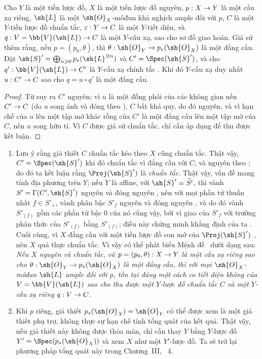 \documentclass[oneside,10pt]{amsart}
\makeatletter
\renewcommand{\geq}{\geqslant}
\newcommand{\ega@arrow}[2]{\mathchoice{#1}{#2}{#2}{#2}}
\renewcommand{\to}{\ega@arrow{\longrightarrow}{\rightarrow}}
\let\EGAOriginalLabel\label
\renewcommand{\label}[1]{\phantomsection\EGAOriginalLabel{#1}}
\makeatother
\begin{document}
\begin{proposition}[8.11.7]
\label{II.8.11.7}
Cho $Y$ là một tiền lược đồ, $X$ là một tiền lược đồ nguyên, $p:X\to Y$ là một cấu xạ riêng, $\sh{L}$ là một $\sh{O}_X$-môđun khả nghịch ample đối với $p$, $C$ là một $Y$-tiền lược đồ chuẩn tắc, $\varepsilon:Y\to C$ là một $Y$-tiết diện, và $q:V=\bb{V}(\sh{L})\to C$ là một $Y$-cấu xạ, sao cho sơ đồ  giao hoán.
Giả sử thêm rằng, nếu $p=(p_0,\theta)$, thì $\theta:\sh{O}_Y\to p_*(\sh{O}_X)$ là một đẳng cấu.
Đặt $\sh{S}'=\bigoplus_{n\geq0}p_*(\sh{L}^{\otimes n})$ và $C'=\Spec(\sh{S}')$, và cho $q':\bb{V}(\sh{L})\to C'$ là $Y$-cấu xạ chính tắc .
Khi đó $Y$-cấu xạ duy nhất $u:C'\to C$ sao cho $q=u\circ q'$ là một đẳng cấu.
\end{proposition}

\begin{proof}
Từ  suy ra $C'$ nguyên;
vì $u$ là một đồng phôi của các không gian nền $C'\to C$ (do $u$ song ánh và đóng theo ), $C$ bất khả quy, do đó nguyên, và vì hạn chế của $u$ lên một tập mở khác rỗng của $C'$ là một đẳng cấu lên một tập mở của $C$, nên $u$ song hữu tỉ.
Vì $C$ được giả sử chuẩn tắc, chỉ cần áp dụng  để thu được kết luận.
\end{proof}

\begin{remark}[8.11.8]
\label{II.8.11.8}
\begin{enumerate}
  \item[\rm{(i)}] Lưu ý rằng giả thiết $C$ chuẩn tắc kéo theo $X$ cũng chuẩn tắc.
  Thật vậy, $C'=\Spec(\sh{S}')$ khi đó chuẩn tắc vì đẳng cấu với $C$, và nguyên theo ; do đó ta kết luận rằng $\Proj(\sh{S}')$ là \emph{chuẩn tắc}.
  Thật vậy, vấn đề mang tính địa phương trên $Y$;
  nếu $Y$ là affine, với $\sh{S}'=\widetilde{S'}$, thì vành $S'=\Gamma(C',\sh{S}')$ nguyên và đóng nguyên , nên với mọi phần tử thuần nhất $f\in S'_+$, vành phân bậc $S'_f$ nguyên và đóng nguyên \cite[t.~I, p.~257 và 261]{I-13}, và do đó vành $S'_{(f)}$ gồm các phần tử bậc 0 của nó cũng vậy, bởi vì giao của $S'_f$ với trường phân thức của $S'_{(f)}$ bằng $S'_{(f)}$;
  điều này chứng minh khẳng định của ta .
  Cuối cùng, vì $X$ đẳng cấu với một tiền lược đồ con mở của $\Proj(\sh{S}')$ , nên $X$ quả thực chuẩn tắc.
  Vì vậy có thể phát biểu Mệnh đề~ dưới dạng sau:
  \emph{Nếu $X$ nguyên và chuẩn tắc, và $p=(p_0,\theta):X\to Y$ là một cấu xạ riêng sao cho $\theta:\sh{O}_Y\to p_*(\sh{O}_X)$ là một đẳng cấu, thì với mọi $\sh{O}_X$-môđun $\sh{L}$ ample đối với $p$, tồn tại đúng một cách co tiết diện không của $V=\bb{V}(\sh{L})$ sao cho thu được một $Y$-lược đồ chuẩn tắc $C$ và một $Y$-cấu xạ riêng $q:V\to C$.}
  \item[\rm{(ii)}] Khi $p$ riêng, giả thiết $p_*(\sh{O}_X)=\sh{O}_Y$ có thể được xem là một giả thiết phụ trợ, không thực sự hạn chế tính tổng quát của kết quả.
  Thật vậy, nếu giả thiết này không được thỏa mãn, chỉ cần thay $Y$ bằng $Y$-lược đồ $Y'=\Spec(p_*(\sh{O}_X))$ và xem $X$ như một $Y'$-lược đồ.
  Ta sẽ trở lại phương pháp tổng quát này trong Chương~III, \textsection~4.
\end{enumerate}
\end{remark}
\end{document}
